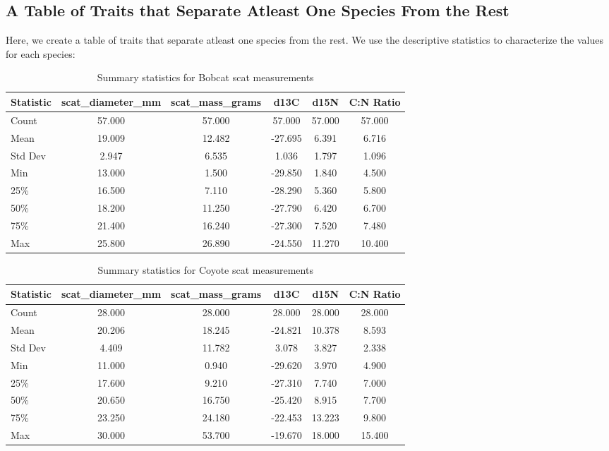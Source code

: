 \documentclass[a4paper]{article}
\begin{document}
\subsection{A Table of Traits that Separate Atleast One Species From the Rest}
Here, we create a table of traits that separate atleast one species from the rest. We use the descriptive statistics to characterize the values for each 
species: \\

\begin{table}[h!]
    \centering
    \begin{tabular}{|l|c|c|c|c|c|}
    \hline
    \textbf{Statistic} & \textbf{scat\_diameter\_mm} & \textbf{scat\_mass\_grams} & \textbf{d13C} & \textbf{d15N} & \textbf{C:N Ratio} \\
    \hline
    Count & 57.000 & 57.000 & 57.000 & 57.000 & 57.000 \\
    Mean & 19.009 & 12.482 & -27.695 & 6.391 & 6.716 \\
    Std Dev & 2.947 & 6.535 & 1.036 & 1.797 & 1.096 \\
    Min & 13.000 & 1.500 & -29.850 & 1.840 & 4.500 \\
    25\% & 16.500 & 7.110 & -28.290 & 5.360 & 5.800 \\
    50\% & 18.200 & 11.250 & -27.790 & 6.420 & 6.700 \\
    75\% & 21.400 & 16.240 & -27.300 & 7.520 & 7.480 \\
    Max & 25.800 & 26.890 & -24.550 & 11.270 & 10.400 \\
    \hline
    \end{tabular}
    \caption{Summary statistics for Bobcat scat measurements}
    \label{tab:bobcat_summary_stats}
\end{table}

\vspace{0.5cm}

\begin{table}[h]
    \centering
    \begin{tabular}{|l|c|c|c|c|c|}
    \hline
    \textbf{Statistic} & \textbf{scat\_diameter\_mm} & \textbf{scat\_mass\_grams} & \textbf{d13C} & \textbf{d15N} & \textbf{C:N Ratio} \\
    \hline
    Count & 28.000 & 28.000 & 28.000 & 28.000 & 28.000 \\
    Mean & 20.206 & 18.245 & -24.821 & 10.378 & 8.593 \\
    Std Dev & 4.409 & 11.782 & 3.078 & 3.827 & 2.338 \\
    Min & 11.000 & 0.940 & -29.620 & 3.970 & 4.900 \\
    25\% & 17.600 & 9.210 & -27.310 & 7.740 & 7.000 \\
    50\% & 20.650 & 16.750 & -25.420 & 8.915 & 7.700 \\
    75\% & 23.250 & 24.180 & -22.453 & 13.223 & 9.800 \\
    Max & 30.000 & 53.700 & -19.670 & 18.000 & 15.400 \\
    \hline
    \end{tabular}
    \caption{Summary statistics for Coyote scat measurements}
    \label{tab:coyote_summary_stats}
\end{table}
\end{document}
